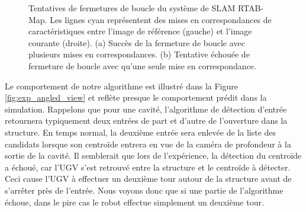\begin{figure}[ht]
  \centering
  \hfil
  \caption[Tentatives de fermetures de boucle du système de SLAM]{
    Tentatives de fermetures de boucle du système de SLAM RTAB-Map. Les lignes cyan représentent des mises en correspondances de caractéristiques entre l'image de référence (gauche) et l'image courante (droite).
    (a) Succès de la fermeture de boucle avec plusieurs mises en correspondances. (b) Tentative échouée de fermeture de boucle avec qu'une seule mise en correspondance.
  }
  \label{fig:visual_loop_closure}
\end{figure}

Le comportement de notre algorithme est illustré dans la Figure \ref{fig:exp_angled_view} et reflète presque le comportement prédit dans la simulation. Rappelons que pour une cavité, l'algorithme de détection d'entrée retournera typiquement deux entrées de part et d'autre de l'ouverture dans la structure. En temps normal, la deuxième entrée sera enlevée de la liste des candidats lorsque son centroïde entrera en vue de la caméra de profondeur à la sortie de la cavité. Il semblerait que lors de l'expérience, la détection du centroïde a échoué, car l'UGV s'est retrouvé entre la structure et le centroïde à détecter. Ceci cause l'UGV à effectuer un deuxième tour autour de la structure avant de s'arrêter près de l'entrée. Nous voyons donc que si une partie de l'algorithme échoue, dans le pire cas le robot effectue simplement un deuxième tour.

